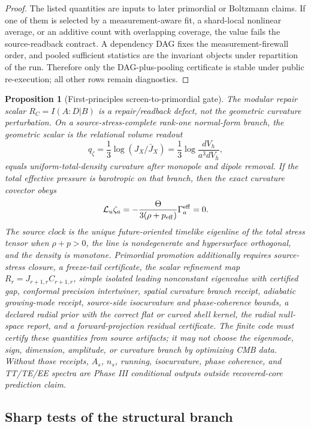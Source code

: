 \documentclass[11pt]{article}
\newtheorem{proposition}[theorem]{Proposition}
\begin{document}
\begin{proof}
The listed quantities are inputs to later primordial or Boltzmann claims.  If
one of them is selected by a measurement-aware fit, a shard-local nonlinear
average, or an additive count with overlapping coverage, the value fails the
source-readback contract.  A dependency DAG fixes the
measurement-firewall order, and pooled sufficient statistics are the invariant
objects under repartition of the run.  Therefore only the DAG-plus-pooling
certificate is stable under public re-execution; all other rows remain
diagnostics.
\end{proof}

\begin{proposition}[First-principles screen-to-primordial gate]\label{prop:compact-source-only-primordial-gate}
The modular repair scalar \(R_C=I(A:D|B)\) is a repair/readback defect, not the
geometric curvature perturbation.  On a source-stress-complete rank-one
normal-form branch, the geometric scalar is the relational volume readout
\[
q_\zeta=\frac13\log(J_X/\bar J_X)
=\frac13\log\frac{dV_h}{a^3dV_{\bar h}},
\]
equals uniform-total-density curvature after monopole and dipole removal.  If
the total effective pressure is barotropic on that branch, then the exact
curvature covector obeys
\[
\mathcal L_u\zeta_a
=
-\frac{\Theta}{3(\rho+p_{\rm eff})}\Gamma_a^{\rm eff}
=0 .
\]
The source clock is the unique future-oriented timelike eigenline of the total
stress tensor when \(\rho+p>0\), the line is nondegenerate and hypersurface
orthogonal, and the density is monotone.  Primordial promotion additionally
requires source-stress closure, a freeze-tail certificate, the scalar
refinement map \(R_r=J_{r+1,r}C_{r+1,r}\), simple isolated leading nonconstant
eigenvalue with certified gap, conformal precision intertwiner, spatial
curvature branch receipt, adiabatic growing-mode receipt, source-side
isocurvature and phase-coherence bounds, a declared radial prior with the
correct flat or curved shell kernel, the radial null-space report, and a
forward-projection residual certificate.  The finite code must certify these
quantities from source artifacts; it may not choose the eigenmode, sign,
dimension, amplitude, or curvature branch by optimizing CMB data.  Without those
receipts, \(A_s\), \(n_s\), running, isocurvature, phase coherence, and
TT/TE/EE spectra are Phase III conditional outputs outside recovered-core
prediction claim.
\end{proposition}

\subsection{Sharp tests of the structural branch}
\end{document}
